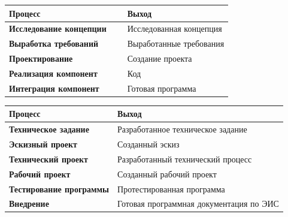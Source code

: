 \documentclass[a4paper,14pt]{extarticle}
\begin{document}

\begin{table}[h!]
	\begin{center}
		\begin{tabular}{|l|p{0.47\linewidth}|}
			\hline
			\textbf{Процесс} & Выход \\ \hline
			\textbf{Исследование концепции} & Исследованная концепция \\ \hline
			\textbf{Выработка требований} & Выработанные требования \\ \hline
			\textbf{Проектирование} & Создание проекта \\ \hline
			\textbf{Реализация компонент} & Код \\ \hline
			\textbf{Интеграция компонент} & Готовая программа \\ \hline
		\end{tabular}
	\end{center}
	\label{}
\end{table}

\newpage


\begin{table}[h!]
	\begin{center}
		\begin{tabular}{|l|l|}
			\hline
			\textbf{Процесс} & Выход \\ \hline
			\textbf{Техническое задание} & Разработанное техническое задание \\ \hline
			\textbf{Эскизный проект} & Созданный эскиз \\ \hline
			\textbf{Технический проект} & Разработанный технический процесс \\ \hline
			\textbf{Рабочий проект} & Созданный  рабочий проект \\ \hline
			\textbf{Тестирование программы} & Протестированная программа \\ \hline
			\textbf{Внедрение} & Готовая программная документация по ЭИС \\ \hline
		\end{tabular}
	\end{center}
	\label{}
\end{table}



\end{document}
